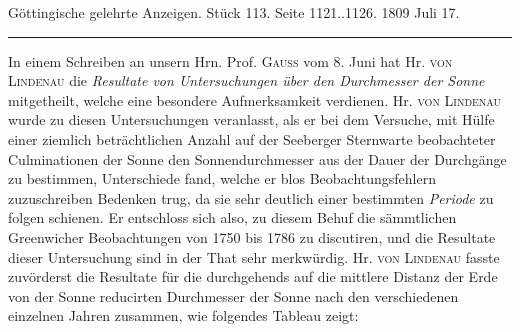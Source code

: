 \clearpage
{}
\hypertarget{native-524-lower}{}\label{native-524-lower}
\begin{center}\small Göttingische gelehrte Anzeigen. Stück 113. Seite 1121..1126. 1809 Juli 17.\\[3pt]\rule{.72\linewidth}{.3pt}\end{center}

In einem Schreiben an unsern Hrn. Prof. \textsc{Gauss} vom 8. Juni hat Hr. \textsc{von Lindenau} die \emph{Resultate von Untersuchungen über den Durchmesser der Sonne} mitgetheilt, welche eine besondere Aufmerksamkeit verdienen. Hr. \textsc{von Lindenau} wurde zu diesen Untersuchungen veranlasst, als er bei dem Versuche, mit Hülfe einer ziemlich beträchtlichen Anzahl auf der Seeberger Sternwarte beobachteter Culminationen der Sonne den Sonnendurchmesser aus der Dauer der Durchgänge zu bestimmen, Unterschiede fand, welche er blos Beobachtungsfehlern zuzuschreiben Bedenken trug, da sie sehr deutlich einer bestimmten \emph{Periode} zu folgen schienen. Er entschloss sich also, zu diesem Behuf die sämmtlichen Greenwicher Beobachtungen von 1750 bis 1786 zu discutiren, und die Resultate dieser Untersuchung sind in der That sehr merkwürdig. Hr. \textsc{von Lindenau} fasste zuvörderst die Resultate für die durchgehends auf die mittlere Distanz der Erde von der Sonne reducirten Durchmesser der Sonne nach den verschiedenen einzelnen Jahren zusammen, wie folgendes Tableau zeigt:

